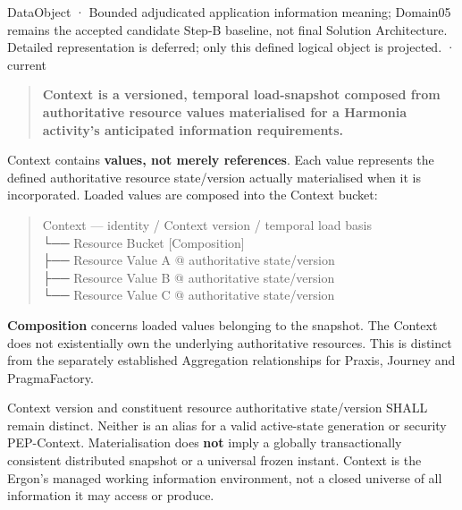 \label{element:76ded4866bf443dabc0849d68b215690}
{\small DataObject · Bounded adjudicated application information meaning; Domain05 remains the accepted candidate Step-B baseline, not final Solution Architecture. Detailed representation is deferred; only this defined logical object is projected. · current}\par

\begin{quote}


\textbf{Context is a versioned, temporal load-snapshot composed from authoritative
resource values materialised for a Harmonia activity's anticipated information
requirements.}



\end{quote}


Context contains \textbf{values, not merely references}. Each value represents the
defined authoritative resource state/version actually materialised when it is
incorporated. Loaded values are composed into the Context bucket:



\begin{quote}\small\ttfamily
Context — identity / Context version / temporal load basis\\
  └── Resource Bucket                         [Composition]\\
        ├── Resource Value A @ authoritative state/version\\
        ├── Resource Value B @ authoritative state/version\\
        └── Resource Value C @ authoritative state/version\\

\end{quote}


\textbf{Composition} concerns loaded values belonging to the snapshot. The Context
does not existentially own the underlying authoritative resources. This is
distinct from the separately established Aggregation relationships for Praxis,
Journey and PragmaFactory.



Context version and constituent resource authoritative state/version SHALL
remain distinct. Neither is an alias for a valid active-state generation or
security PEP-Context. Materialisation does \textbf{not} imply a globally
transactionally consistent distributed snapshot or a universal frozen instant.
Context is the Ergon's managed working information environment, not a closed
universe of all information it may access or produce.



